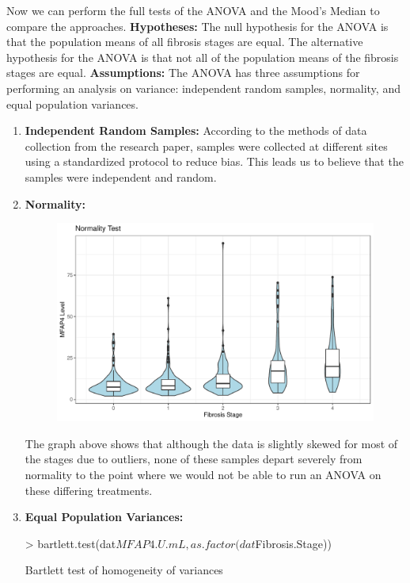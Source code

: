\documentclass{article}
\begin{document}
\begin{enumerate}
  Now we can perform the full tests of the ANOVA and the Mood's Median to compare the approaches. 
  \textbf{Hypotheses:}
  The null hypothesis for the ANOVA is that the population means of all fibrosis stages are equal. The alternative hypothesis for the ANOVA is that not all of the population means of the fibrosis stages are equal. 
  \newline \textbf{Assumptions:}
  The ANOVA has three assumptions for performing an analysis on variance: independent random samples, normality, and equal population variances.
  \begin{enumerate}
  \item \textbf{Independent Random Samples:} According to the methods of data collection from the research paper, samples were collected at different sites using a standardized protocol to reduce bias. This leads us to believe that the samples were independent and random. 
  \item \textbf{Normality:}
  \begin{figure}[H]
\includegraphics{finalExam-011}
\end{figure}
The graph above shows that although the data is slightly skewed for most of the stages due to outliers, none of these samples depart severely from normality to the point where we would not be able to run an ANOVA on these differing treatments. 
\item \textbf{Equal Population Variances:}
\begin{Schunk}
\begin{Sinput}
> bartlett.test(dat$MFAP4.U.mL, as.factor(dat$Fibrosis.Stage))
\end{Sinput}
\begin{Soutput}
	Bartlett test of homogeneity of variances


\end{Soutput}
\end{Schunk}
\end{enumerate}
\end{enumerate}
\end{document}
